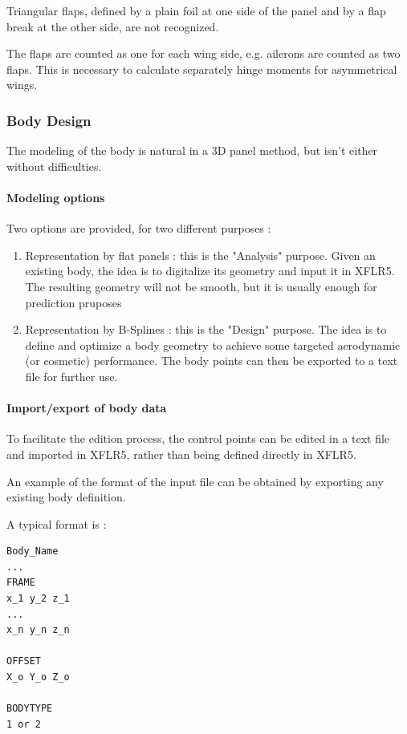 \documentclass[a4paper,twoside,12pt,dvips]{article}
\begin{document}
Triangular flaps, defined by a plain foil at one side of the panel and
by a flap break at the other side, are not recognized.

The flaps are counted as one for each wing side, e.g. ailerons are
counted as two flaps. This is necessary to calculate separately hinge
moments for asymmetrical wings.

\subsubsection{Body Design}

The modeling of the body is natural in a 3D panel method, but isn't
either without difficulties.

\paragraph{Modeling options}

Two options are provided, for two different purposes :

\begin{enumerate}
\item Representation by flat panels : this is the "Analysis"
purpose. \newline
Given an existing body, the idea is to digitalize its geometry and
input it in XFLR5. The resulting geometry will not be smooth, but it
is usually enough for prediction pruposes
\item Representation by B-Splines : this is the "Design"
purpose. \newline
The idea is to define and optimize a body geometry to achieve some
targeted aerodynamic (or cosmetic) performance. The body points can
then be exported to a text file for further use.
\end{enumerate}

\paragraph{Import/export of body data}

To facilitate the edition process, the control points can be edited in
a text file and imported in XFLR5, rather than being defined directly
in XFLR5.

An example of the format of the input file can be obtained by
exporting any existing body definition.

A typical format is :

\begin{verbatim}
Body_Name
...
FRAME
x_1 y_2 z_1
...
x_n y_n z_n

OFFSET
X_o Y_o Z_o

BODYTYPE
1 or 2
\end{verbatim}
\end{document}
